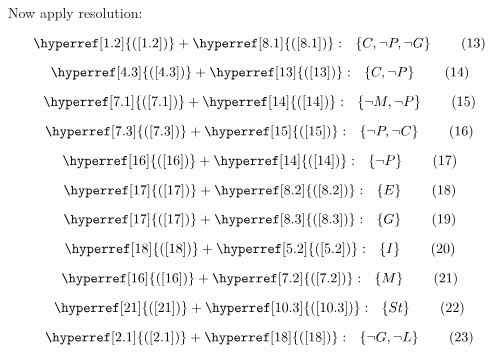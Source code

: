 \documentclass[a4paper]{article}
\newcommand{\refequation}[1]{\hyperref[#1]{(\ref{#1})}}
\begin{document}
Now apply resolution:

\begin{equation}
\refequation{1.2} + \refequation{8.1}: \  \ \left\{ C , \lnot P , \lnot G \right\} \tag{13} \label{13}
\end{equation}

\begin{equation}
\refequation{4.3} + \refequation{13}: \  \ \left\{ C , \lnot P \right\} \tag{14} \label{14}
\end{equation}

\begin{equation}
\refequation{7.1} + \refequation{14}: \  \ \left\{ \lnot M , \lnot P \right\} \tag{15} \label{15}
\end{equation}

\begin{equation}
\refequation{7.3} + \refequation{15}: \  \ \left\{ \lnot P , \lnot C \right\} \tag{16} \label{16}
\end{equation}

\begin{equation}
\refequation{16} + \refequation{14}: \  \ \left\{ \lnot P\right\} \tag{17} \label{17}
\end{equation}

\begin{equation}
\refequation{17} + \refequation{8.2}: \  \ \left\{ E \right\} \tag{18} \label{18}
\end{equation}

\begin{equation}
\refequation{17} + \refequation{8.3}: \  \ \left\{ G \right\} \tag{19} \label{19}
\end{equation}

\begin{equation}
\refequation{18} + \refequation{5.2}: \  \ \left\{ I \right\} \tag{20} \label{20}
\end{equation}

\begin{equation}
\refequation{16} + \refequation{7.2}: \  \ \left\{ M \right\} \tag{21} \label{21}
\end{equation}

\begin{equation}
\refequation{21} + \refequation{10.3}: \  \ \left\{ St \right\} \tag{22} \label{22}
\end{equation}

\begin{equation}
\refequation{2.1} + \refequation{18}: \  \ \left\{ \lnot G , \lnot L \right\} \tag{23} \label{23}
\end{equation}
\end{document}
